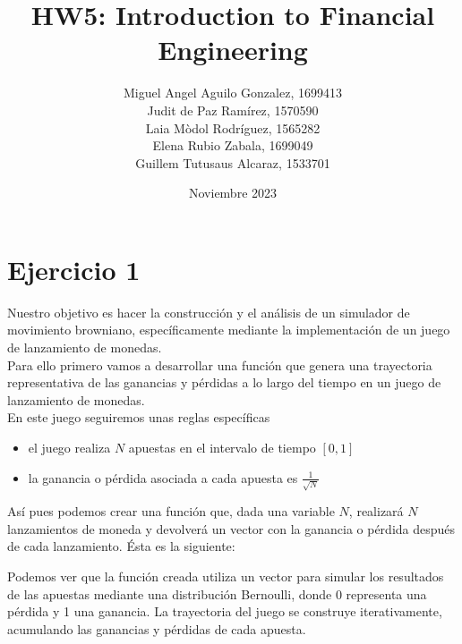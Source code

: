 \documentclass[a4paper,]{article}
\title{\textbf{HW5: Introduction to Financial Engineering}}
\author{Miguel Angel Aguilo Gonzalez, 1699413 \\ Judit de Paz Ramírez, 1570590 \\ Laia Mòdol Rodríguez, 1565282 \\ Elena Rubio Zabala, 1699049 \\ Guillem Tutusaus Alcaraz, 1533701 }
\date{Noviembre 2023}
\begin{document}
\maketitle

\newpage

\section*{Ejercicio 1}
Nuestro  objetivo es hacer la construcción y el análisis de un simulador de movimiento browniano, específicamente mediante la implementación de un juego de lanzamiento de monedas.\\

Para ello primero vamos a desarrollar una función que genera una trayectoria representativa de las ganancias y pérdidas a lo largo del tiempo en un juego de lanzamiento de monedas. \\

En este juego seguiremos unas reglas específicas
\begin{itemize}
    \item el juego realiza $N$ apuestas en el intervalo de tiempo $[0, 1]$
    \item la ganancia o pérdida asociada a cada apuesta es $\frac{1}{\sqrt{N}}$
\end{itemize}

Así pues podemos crear una función que, dada una variable $N$,
realizará $N$ lanzamientos de moneda y devolverá un vector con la ganancia o pérdida después de cada lanzamiento. Ésta es la siguiente:
\vspace{1cm}

Podemos ver que la función creada utiliza un vector para simular los resultados de las apuestas mediante una distribución Bernoulli, donde 0 representa una pérdida y 1 una ganancia. La trayectoria del juego se construye iterativamente, acumulando las ganancias y pérdidas de cada apuesta. \\
\end{document}
